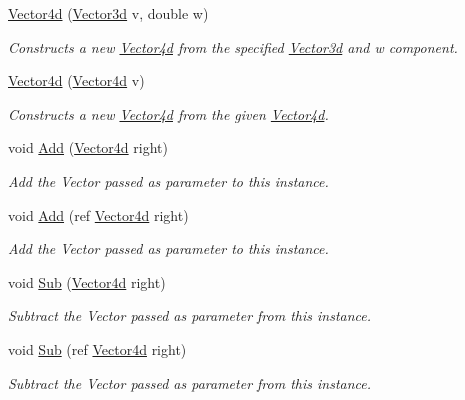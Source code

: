 \begin{DoxyCompactItemize}
\hyperlink{struct_open_t_k_1_1_vector4d_a3fc1e5e225c53d82529f8401ac285a21}{Vector4d} (\hyperlink{struct_open_t_k_1_1_vector3d}{Vector3d} v, double w)
\begin{DoxyCompactList}\small\item\em Constructs a new \hyperlink{struct_open_t_k_1_1_vector4d}{Vector4d} from the specified \hyperlink{struct_open_t_k_1_1_vector3d}{Vector3d} and w component. \end{DoxyCompactList}\item 
\hyperlink{struct_open_t_k_1_1_vector4d_aa03c3f431416538c942d481a9f69643e}{Vector4d} (\hyperlink{struct_open_t_k_1_1_vector4d}{Vector4d} v)
\begin{DoxyCompactList}\small\item\em Constructs a new \hyperlink{struct_open_t_k_1_1_vector4d}{Vector4d} from the given \hyperlink{struct_open_t_k_1_1_vector4d}{Vector4d}. \end{DoxyCompactList}\item 
void \hyperlink{struct_open_t_k_1_1_vector4d_a9142bbf5c5c0705863e6459421714682}{Add} (\hyperlink{struct_open_t_k_1_1_vector4d}{Vector4d} right)
\begin{DoxyCompactList}\small\item\em Add the Vector passed as parameter to this instance.\end{DoxyCompactList}\item 
void \hyperlink{struct_open_t_k_1_1_vector4d_aa7efe5d13e8f35c03662793906326e45}{Add} (ref \hyperlink{struct_open_t_k_1_1_vector4d}{Vector4d} right)
\begin{DoxyCompactList}\small\item\em Add the Vector passed as parameter to this instance.\end{DoxyCompactList}\item 
void \hyperlink{struct_open_t_k_1_1_vector4d_ad8316ab79e1c7ae207ee19e55a40a413}{Sub} (\hyperlink{struct_open_t_k_1_1_vector4d}{Vector4d} right)
\begin{DoxyCompactList}\small\item\em Subtract the Vector passed as parameter from this instance.\end{DoxyCompactList}\item 
void \hyperlink{struct_open_t_k_1_1_vector4d_aaf10c5a99b18ca995a284a77eab323bd}{Sub} (ref \hyperlink{struct_open_t_k_1_1_vector4d}{Vector4d} right)
\begin{DoxyCompactList}\small\item\em Subtract the Vector passed as parameter from this instance.\end{DoxyCompactList}\item 

\end{DoxyCompactItemize}
